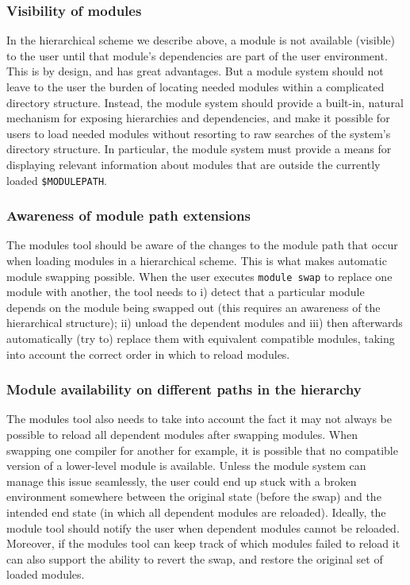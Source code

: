 \subsubsection{Visibility of modules}
\label{sec:hierarchical_consequences_visibility}

In the hierarchical scheme we describe above, a module is not available (visible)
to the user until that module's dependencies are part of the user environment.  This
is by design, and has great advantages. But a module system should not leave to the
user the burden of locating needed modules within a complicated directory structure.  Instead, the module system should provide a built-in, natural mechanism for exposing hierarchies and
dependencies, and make it possible for users to load needed modules
without resorting to raw searches of the system's directory structure. In particular, the module system must provide a means for
displaying relevant information about modules that are outside the 
currently loaded \texttt{\small \$MODULEPATH}.

\subsubsection{Awareness of module path extensions}
\label{sec:hierarchical_consequences_extensions}

The modules tool should be aware of the changes  to the module path that
occur when loading modules in a hierarchical scheme. This is what makes
automatic module swapping possible. When the user executes \texttt{\small module swap} to replace one module with another, the tool needs to i) detect that a particular
module depends on the module being swapped out (this requires an awareness of
the hierarchical structure); ii) unload the dependent
modules and iii) then afterwards
automatically (try to) replace them with equivalent compatible modules, taking into
account the correct order in which to reload modules.

\subsubsection{Module availability on different paths in the hierarchy}
\label{sec:hierarchical_consequences_availability}

The modules tool also needs to take into account the fact it may not always be
possible to reload all dependent modules after swapping modules. When swapping
one compiler for another for example, it is possible that no compatible version of a
lower-level module is available. Unless the module system can manage this issue
seamlessly, the user could end up stuck with a broken environment somewhere between
the original state (before the swap) and the intended end state (in which all
dependent modules are reloaded). Ideally, the module tool should notify the user
when dependent modules cannot be reloaded. Moreover, if the modules tool can keep
track of which modules failed to reload it can also support the ability to revert
the swap, and restore the original set of loaded modules.

